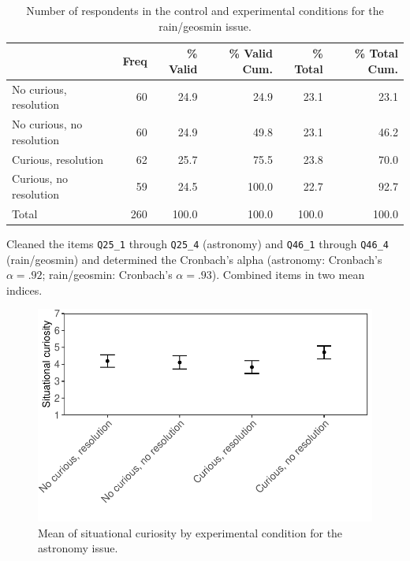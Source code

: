 \documentclass[
  letterpaper,
  DIV=11,
  numbers=noendperiod]{scrartcl}
\begin{document}
\hypertarget{tbl-rexpcond}{}
\begin{table}
\caption{\label{tbl-rexpcond}Number of respondents in the control and experimental conditions for the
rain/geosmin issue. }\tabularnewline

\centering
\begin{tabular}[t]{l|r|r|r|r|r}
\hline
  & Freq & \% Valid & \% Valid Cum. & \% Total & \% Total Cum.\\
\hline
No curious, resolution & 60 & 24.9 & 24.9 & 23.1 & 23.1\\
\hline
No curious, no resolution & 60 & 24.9 & 49.8 & 23.1 & 46.2\\
\hline
Curious, resolution & 62 & 25.7 & 75.5 & 23.8 & 70.0\\
\hline
Curious, no resolution & 59 & 24.5 & 100.0 & 22.7 & 92.7\\
\hline
Total & 260 & 100.0 & 100.0 & 100.0 & 100.0\\
\hline
\end{tabular}
\end{table}

Cleaned the items \texttt{Q25\_1} through \texttt{Q25\_4} (astronomy)
and \texttt{Q46\_1} through \texttt{Q46\_4} (rain/geosmin) and
determined the Cronbach's alpha (astronomy: Cronbach's \(\alpha = .92\);
rain/geosmin: Cronbach's \(\alpha = .93\)). Combined items in two mean
indices.

\begin{figure}

{\centering \includegraphics{curiosity_student-pilot_data-analysis_files/figure-pdf/fig-asitcur-1.pdf}

}

\caption{\label{fig-asitcur}Mean of situational curiosity by
experimental condition for the astronomy issue.}

\end{figure}
\end{document}
